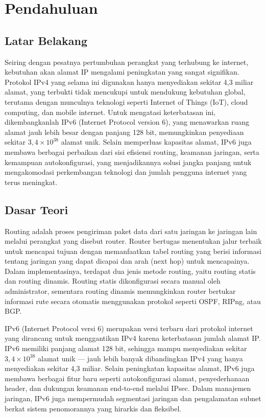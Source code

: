 \section{Pendahuluan}
\subsection{Latar Belakang}
Seiring dengan pesatnya pertumbuhan perangkat yang terhubung ke internet, kebutuhan akan alamat IP mengalami peningkatan yang sangat signifikan. Protokol IPv4 yang selama ini digunakan hanya menyediakan sekitar 4,3 miliar alamat, yang terbukti tidak mencukupi untuk mendukung kebutuhan global, terutama dengan munculnya teknologi seperti Internet of Things (IoT), cloud computing, dan mobile internet. Untuk mengatasi keterbatasan ini, dikembangkanlah IPv6 (Internet Protocol version 6), yang menawarkan ruang alamat jauh lebih besar dengan panjang 128 bit, memungkinkan penyediaan sekitar $3,4\times10^{38}$ alamat unik. Selain memperluas kapasitas alamat, IPv6 juga membawa berbagai perbaikan dari sisi efisiensi routing, keamanan jaringan, serta kemampuan autokonfigurasi, yang menjadikannya solusi jangka panjang untuk mengakomodasi perkembangan teknologi dan jumlah pengguna internet yang terus meningkat.

\subsection{Dasar Teori}
Routing adalah proses pengiriman paket data dari satu jaringan ke jaringan lain melalui perangkat yang disebut router. Router bertugas menentukan jalur terbaik untuk mencapai tujuan dengan memanfaatkan tabel routing yang berisi informasi tentang jaringan yang dapat dicapai dan arah (next hop) untuk mencapainya. Dalam implementasinya, terdapat dua jenis metode routing, yaitu routing statis dan routing dinamis. Routing statis dikonfigurasi secara manual oleh administrator, sementara routing dinamis memungkinkan router bertukar informasi rute secara otomatis menggunakan protokol seperti OSPF, RIPng, atau BGP.

IPv6 (Internet Protocol versi 6) merupakan versi terbaru dari protokol internet yang dirancang untuk menggantikan IPv4 karena keterbatasan jumlah alamat IP. IPv6 memiliki panjang alamat 128 bit, sehingga mampu menyediakan sekitar $3,4\times10^{38}$ alamat unik — jauh lebih banyak dibandingkan IPv4 yang hanya menyediakan sekitar 4,3 miliar. Selain peningkatan kapasitas alamat, IPv6 juga membawa berbagai fitur baru seperti autokonfigurasi alamat, penyederhanaan header, dan dukungan keamanan end-to-end melalui IPsec. Dalam manajemen jaringan, IPv6 juga mempermudah segmentasi jaringan dan pengalamatan subnet berkat sistem penomorannya yang hirarkis dan fleksibel.

